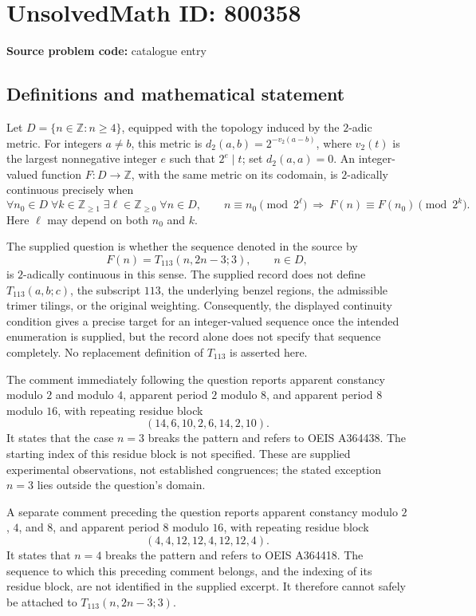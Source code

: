\documentclass[11pt]{article}
\newcommand{\Z}{\mathbb{Z}}
\begin{document}
\section*{UnsolvedMath ID: 800358}
\textbf{Source problem code:} catalogue entry
\subsection{Definitions and mathematical statement}
Let \(D=\{n\in\Z:n\geq4\}\), equipped with the topology induced by the \(2\)-adic metric. For integers \(a\neq b\), this metric is \(d_2(a,b)=2^{-v_2(a-b)}\), where \(v_2(t)\) is the largest nonnegative integer \(e\) such that \(2^e\mid t\); set \(d_2(a,a)=0\). An integer-valued function \(F:D\to\Z\), with the same metric on its codomain, is \(2\)-adically continuous precisely when
\[
\forall n_0\in D\;\forall k\in\Z_{\geq1}\;\exists \ell\in\Z_{\geq0}\;\forall n\in D,\qquad
n\equiv n_0\pmod{2^\ell}\ \Longrightarrow\ F(n)\equiv F(n_0)\pmod{2^k}.
\]
Here \(\ell\) may depend on both \(n_0\) and \(k\).

The supplied question is whether the sequence denoted in the source by
\[
F(n)=T_{113}(n,2n-3;3),\qquad n\in D,
\]
is \(2\)-adically continuous in this sense. The supplied record does not define \(T_{113}(a,b;c)\), the subscript \(113\), the underlying benzel regions, the admissible trimer tilings, or the original weighting. Consequently, the displayed continuity condition gives a precise target for an integer-valued sequence once the intended enumeration is supplied, but the record alone does not specify that sequence completely. No replacement definition of \(T_{113}\) is asserted here.

The comment immediately following the question reports apparent constancy modulo \(2\) and modulo \(4\), apparent period \(2\) modulo \(8\), and apparent period \(8\) modulo \(16\), with repeating residue block
\[
(14,6,10,2,6,14,2,10).
\]
It states that the case \(n=3\) breaks the pattern and refers to OEIS A364438. The starting index of this residue block is not specified. These are supplied experimental observations, not established congruences; the stated exception \(n=3\) lies outside the question's domain.

A separate comment preceding the question reports apparent constancy modulo \(2\), \(4\), and \(8\), and apparent period \(8\) modulo \(16\), with repeating residue block
\[
(4,4,12,12,4,12,12,4).
\]
It states that \(n=4\) breaks the pattern and refers to OEIS A364418. The sequence to which this preceding comment belongs, and the indexing of its residue block, are not identified in the supplied excerpt. It therefore cannot safely be attached to \(T_{113}(n,2n-3;3)\).
\end{document}
